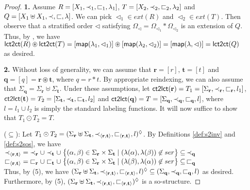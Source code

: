 \documentclass{llncs}
\begin{document}
\begin{proof}\textbf{1. }Assume $R=\left[ X_1,\prec_1,\sqsubset_1,\lambda_1 \right]$, $T=\left[ X_2,\prec_2,\sqsubset_2,\lambda_2 \right]$ and $Q=\left[ X_1\uplus X_1,\prec,\sqsubset,\lambda \right]$. We can pick $\lhd_1\in ext(R)$ and $\lhd_2\in ext(T)$. Then observe that a stratified order $\lhd$ satisfying $\Omega_{\lhd} = \Omega_{\lhd_1}\ast \Omega_{\lhd_2}$ is an extension of $Q$. Thus, by , we have 
$\mathsf{lct2ct}(R) \circledast \mathsf{lct2ct}(T) = [\mathsf{map}(\lambda_1,\lhd_1)]\circledast [\mathsf{map}(\lambda_2,\lhd_2)] =  [\mathsf{map}(\lambda,\lhd)] = \mathsf{lct2ct}(Q)$ as desired.

\textbf{2. } Without loss of generality, we can assume that $\mathbf{r}= [r]$, $\mathbf{t}=[t]$ and $\mathbf{q}=[q] = \mathbf{r}\circledast \mathbf{t}$, where $q = r \ast t$. By appropriate reindexing, we can also assume that $\Sigma_{\mathbf{q}} = \Sigma_{\mathbf{r}}\uplus \Sigma_{\mathbf{t}}$. Under these assumptions, let $\mathsf{ct2lct}(\mathbf{r})=T_{1} = \left[ \Sigma_{\mathbf{r}},\prec_{\mathbf{r}},\sqsubset_{\mathbf{r}},l_{1} \right]$, $\mathsf{ct2lct}(\mathbf{t})=T_{2} = \left[ \Sigma_{\mathbf{t}},\prec_{\mathbf{t}},\sqsubset_{\mathbf{t}},l_{2} \right]$ and $\mathsf{ct2lct}(\mathbf{q}) = T = \left[ \Sigma_{\mathbf{q}},\prec_{\mathbf{q}},\sqsubset_{\mathbf{q}},l \right]$, where $l=l_{1}\cup l_{2}$ is simply the standard labeling functions. It will now suffice to show that $T_{1}\odot T_{2} = T$.


($\subseteq$): Let $T_{1}\odot T_{2} = (\Sigma_{\mathbf{r}}\uplus \Sigma_{\mathbf{t}},\prec_{\langle \mathbf{r},\mathbf{t}\rangle},\sqsubset_{\langle \mathbf{r},\mathbf{t}\rangle},l)^{\lozenge}$. By Definitions \ref{def:s2inv} and \ref{def:s2sos}, we have\\
\mbox{\hspace{1.5cm}}$\prec_{\langle \mathbf{r},\mathbf{t}\rangle}\;=\; \prec_{\mathbf{r}}\cup \prec_{\mathbf{t}}\cup\; \bigl\{(\alpha,\beta)\in \Sigma_{\mathbf{r}}\times \Sigma_{\mathbf{t}}\mid (\lambda(\alpha),\lambda(\beta))\not\in ser\bigr\} \subseteq\, \prec_{\mathbf{q}}$\\
\mbox{\hspace{1.5cm}}$\sqsubset_{\langle \mathbf{r},\mathbf{t}\rangle}\;=\; \sqsubset_{\mathbf{r}}\cup \sqsubset_{\mathbf{t}}\cup\; \bigl\{(\alpha,\beta)\in \Sigma_{\mathbf{r}}\times \Sigma_{\mathbf{t}}\mid (\lambda(\beta),\lambda(\alpha))\not\in ser\bigr\}\subseteq\, \sqsubset_{\mathbf{q}}$\\
Thus, by  (5),  we have $(\Sigma_{\mathbf{r}}\uplus \Sigma_{\mathbf{t}},\prec_{\langle \mathbf{r},\mathbf{t}\rangle},\sqsubset_{\langle \mathbf{r},\mathbf{t}\rangle},l)^{\lozenge}\subseteq  (\Sigma_{\mathbf{q}},\prec_{\mathbf{q}},\sqsubset_{\mathbf{q}},l)$ as desired. Furthermore, by   (5),  $(\Sigma_{\mathbf{r}}\uplus \Sigma_{\mathbf{t}},\prec_{\langle \mathbf{r},\mathbf{t}\rangle},\sqsubset_{\langle \mathbf{r},\mathbf{t}\rangle})^{\lozenge}$ is a so-structure.



\end{proof}
\end{document}
